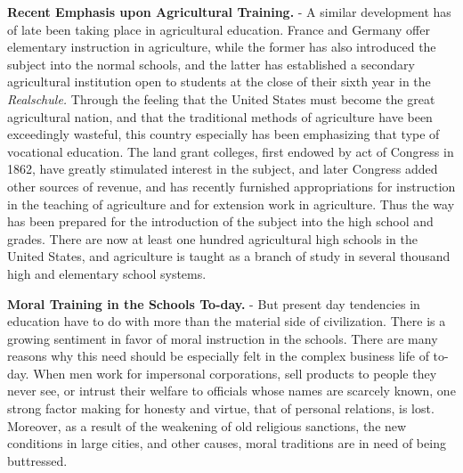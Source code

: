 \documentclass[]{book}
\begin{document}
\textbf{Recent Emphasis upon Agricultural Training.} - A similar development has of late been taking place in agricultural education. France and Germany offer elementary instruction in agriculture, while the former has also introduced the subject into the normal schools, and the latter has established a secondary agricultural institution open to students at the close of their sixth year in the \emph{Realschule.} Through the feeling that the United States must become the great agricultural nation, and that the traditional methods of agriculture have been exceedingly wasteful, this country especially has been emphasizing that type of vocational education. The land grant colleges, first endowed by act of Congress in 1862, have greatly stimulated interest in the subject, and later Congress added other sources of revenue, and has recently furnished appropriations for instruction in the teaching of agriculture and for extension work in agriculture. Thus the way has been prepared for the introduction of the subject into the high school and grades. There are now at least one hundred agricultural high schools in the United States, and agriculture is taught as a branch of study in several thousand high and elementary school systems.

\textbf{Moral Training in the Schools To-day.} - But present day tendencies in education have to do with more than the material side of civilization. There is a growing sentiment in favor of moral instruction in the schools. There are many reasons why this need should be especially felt in the complex business life of to-day. When men work for impersonal corporations, sell products to people they never see, or intrust their welfare to officials whose names are scarcely known, one strong factor making for honesty and virtue, that of personal relations, is lost. Moreover, as a result of the weakening of old religious sanctions, the new conditions in large cities, and other causes, moral traditions are in need of being buttressed.
\end{document}
